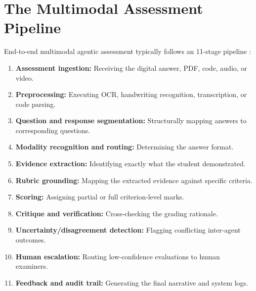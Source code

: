 \documentclass[11pt,a4paper]{article}
\begin{document}
\section{The Multimodal Assessment Pipeline}
End-to-end multimodal agentic assessment typically follows an 11-stage pipeline \cite{P011, P021, P022}:
\begin{enumerate}
    \item \textbf{Assessment ingestion:} Receiving the digital answer, PDF, code, audio, or video.
    \item \textbf{Preprocessing:} Executing OCR, handwriting recognition, transcription, or code parsing.
    \item \textbf{Question and response segmentation:} Structurally mapping answers to corresponding questions.
    \item \textbf{Modality recognition and routing:} Determining the answer format.
    \item \textbf{Evidence extraction:} Identifying exactly what the student demonstrated.
    \item \textbf{Rubric grounding:} Mapping the extracted evidence against specific criteria.
    \item \textbf{Scoring:} Assigning partial or full criterion-level marks.
    \item \textbf{Critique and verification:} Cross-checking the grading rationale.
    \item \textbf{Uncertainty/disagreement detection:} Flagging conflicting inter-agent outcomes.
    \item \textbf{Human escalation:} Routing low-confidence evaluations to human examiners.
    \item \textbf{Feedback and audit trail:} Generating the final narrative and system logs.
\end{enumerate}
\end{document}
